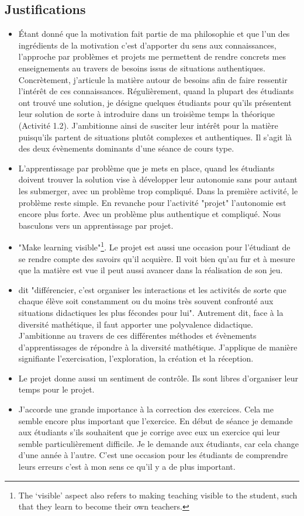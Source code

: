 \subsection{Justifications}
\begin{itemize}
    \item Étant donné que la motivation fait partie de ma philosophie et que l’un des ingrédients de la motivation c’est d’apporter du sens aux connaissances, l’approche par problèmes et projets me permettent de rendre concrets mes enseignements au travers de besoins issus de situations authentiques. Concrètement, j'articule la matière autour de besoins afin de faire ressentir l'intérêt de ces connaissances. Régulièrement, quand la plupart des étudiants ont trouvé une solution, je désigne quelques étudiants pour qu’ils présentent leur solution de sorte à introduire dans un troisième temps la théorique (Activité 1.2). J’ambitionne ainsi de susciter leur intérêt pour la matière puisqu’ils partent de situations plutôt complexes et authentiques. Il s’agit là des deux évènements dominants d’une séance de cours type.
    \item L'apprentissage par problème que je mets en place, quand les étudiants doivent trouver la solution vise à développer leur autonomie sans pour autant les submerger, avec un problème trop compliqué. Dans la première activité, le problème reste simple. En revanche pour l'activité "projet" l’autonomie est encore plus forte. Avec un problème plus authentique et compliqué. Nous basculons vers un apprentissage par projet.
    \item "Make learning visible"\footnote{The ‘visible’ aspect also refers to making teaching visible to the student, such that they learn to become their own teachers.}\cite{hattie2012visible}. Le projet est aussi une occasion pour l'étudiant de se rendre compte des savoirs qu'il acquière. Il voit bien qu'au fur et à mesure que la matière est vue il peut aussi avancer dans la réalisation de son jeu.
    \item \cite{perrenoud1992differenciation} dit "différencier, c’est organiser les interactions et les activités de sorte que chaque élève soit constamment ou du moins très souvent confronté aux situations didactiques les plus fécondes pour lui". Autrement dit, face à la diversité mathétique, il faut apporter une polyvalence didactique. J’ambitionne au travers de ces différentes méthodes et évènements d’apprentissages\cite{Leclercqevenements} de répondre à la diversité mathétique. J'applique de manière signifiante l'exercisation, l'exploration, la création et la réception.
    \item Le projet donne aussi un sentiment de contrôle. Ils sont libres d'organiser leur temps pour le projet.
    \item J'accorde une grande importance à la correction des exercices. Cela me semble encore plus important que l'exercice. En début de séance je demande aux étudiants s'ils souhaitent que je corrige avec eux un exercice qui leur semble particulièrement difficile. Je le demande aux étudiants, car cela change d'une année à l'autre. C'est une occasion pour les étudiants de comprendre leurs erreurs c'est à mon sens ce qu'il y a de plus important.
\end{itemize}
\clearpage

